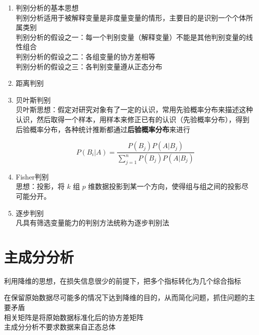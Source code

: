 \documentclass[UTF8,10pt]{book}
\begin{document}
\begin{enumerate}
	\def\labelenumi{\arabic{enumi}.}
	\item
	判别分析的基本思想\\
	判别分析适用于被解释变量是非度量变量的情形，主要目的是识别一个个体所属类别\\
	判别分析的假设之一：每一个判别变量（解释变量）不能是其他判别变量的线性组合\\
	判别分析的假设之二：各组变量的协方差相等\\
	判别分析的假设之三：各判别变量遵从正态分布
	\item
	距离判别
	\item
	贝叶斯判别\\
	贝叶斯思想：假定对研究对象有了一定的认识，常用先验概率分布来描述这种认识，然后取得一个样本，用样本来修正已有的认识（先验概率分布），得到后验概率分布，各种统计推断都通过\textbf{后验概率分布}来进行
	
	\[P(B_i | A) = \frac{P(B_j)P(A | B_j)}{\sum_{j=1}^{n} P(B_j)P(A | B_j )}\]
	\item
	Fisher判别\\
	思想：投影，将 \(k\) 组 \(p\)
	维数据投影到某一个方向，使得组与组之间的投影尽可能分开。
	\item
	逐步判别\\
	凡具有筛选变量能力的判别方法统称为逐步判别法
\end{enumerate}

\section{主成分分析}\label{header-n62}

利用降维的思想，在损失信息很少的前提下，把多个指标转化为几个综合指标

在保留原始数据尽可能多的情况下达到降维的目的，从而简化问题，抓住问题的主要矛盾\\
相关矩阵是将原始数据标准化后的协方差矩阵\\
主成分分析不要求数据来自正态总体
\end{document}
